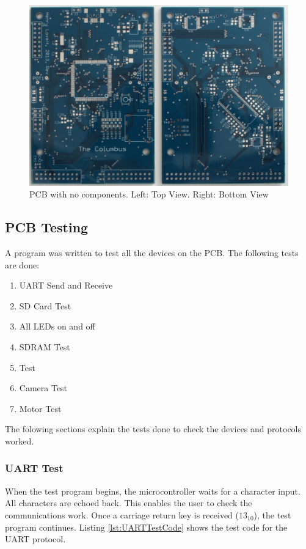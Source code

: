 \begin{figure}
\includegraphics[width=\textwidth]{./Figures/PCB_Bare.jpg}
\caption{PCB with no components. Left: Top View. Right: Bottom View}
\label{fig:PCB:Bare}
\end{figure}


\subsection{PCB Testing}
A program was written to test all the devices on the PCB. The following tests are done:
\begin{enumerate}
\item UART Send and Receive
\item SD Card Test
\item All LEDs on and off
\item SDRAM Test
\item \itc Test
\item Camera Test
\item Motor Test
\end{enumerate}
The folowing sections explain the tests done to check the devices and protocols worked.

\subsubsection{UART Test}
When the test program begins, the microcontroller waits for a character input. All characters are echoed back. This enables the user to check the communications work. Once a carriage return key is received ($13_{10}$), the test program continues. Listing \ref{lst:UARTTestCode} shows the test code for the UART protocol.

